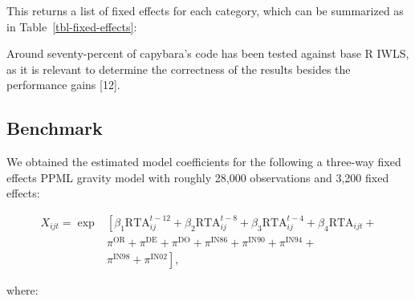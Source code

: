 \documentclass[
  10pt,
  letterpaper,
]{article}
\begin{document}
This returns a list of fixed effects for each category, which can be
summarized as in Table~\ref{tbl-fixed-effects}:

\begin{table}

\caption{\label{tbl-fixed-effects}Partial view of the returned fixed effects. Source: own creation.}


\end{table}%

Around seventy-percent of capybara's code has been tested against base R
IWLS, as it is relevant to determine the correctness of the results
besides the performance gains {[}12{]}.

\subsection{Benchmark}\label{benchmark}

We obtained the estimated model coefficients for the following a
three-way fixed effects PPML gravity model with roughly 28,000
observations and 3,200 fixed effects:

\begin{align}
\label{eq:benchmarks}
X_{ijt} = \exp&\left[\beta_1 \text{RTA}_{ij}^{t-12} + \beta_2 \text{RTA}_{ij}^{t-8} + \beta_3 \text{RTA}_{ij}^{t-4} + \beta_4 \text{RTA}_{ijt} + \right. \tag{Globalization} \\
\:& \left. \pi^{\text{OR}} + \pi^{\text{DE}} + \pi^{\text{DO}} + \pi^{\text{IN86}} + \pi^{\text{IN90}} + \pi^{\text{IN94}} + \right. \nonumber \\
\:& \left. \pi^{\text{IN98}} + \pi^{\text{IN02}} \right], \nonumber
\end{align}

where:
\end{document}
